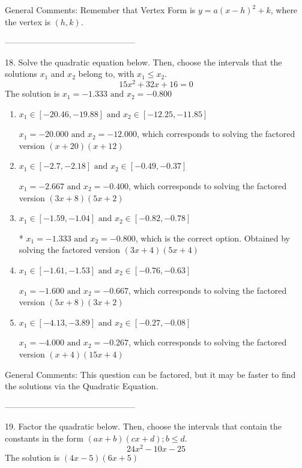 \documentclass{article}[14pt]
\begin{document}
General Comments: Remember that Vertex Form is $y = a(x-h)^2+k$, where the vertex is $(h, k)$.

-----------------------------------------------

18. Solve the quadratic equation below. Then, choose the intervals that the solutions $x_1$ and $x_2$ belong to, with $x_1 \leq x_2$.
$$ 15x^{2} +32 x + 16 = 0 $$ 
The solution is $ x_1 = -1.333 \text{ and } x_2 = -0.800 $ 

\begin{enumerate}[label=\Alph*.] 
\item $ x_1 \in [-20.46, -19.88] \text{ and } x_2 \in [-12.25, -11.85] $ 

 $x_1 = -20.000 \text{ and } x_2 = -12.000$, which corresponds to solving the factored version $(x + 20)(x + 12)$ 
\item $ x_1 \in [-2.7, -2.18] \text{ and } x_2 \in [-0.49, -0.37] $ 

 $x_1 = -2.667 \text{ and } x_2 = -0.400$, which corresponds to solving the factored version $(3x + 8)(5x + 2)$ 
\item $ x_1 \in [-1.59, -1.04] \text{ and } x_2 \in [-0.82, -0.78] $ 

 * $x_1 = -1.333 \text{ and } x_2 = -0.800$, which is the correct option. Obtained by solving the factored version $(3x + 4)(5x + 4)$ 
\item $ x_1 \in [-1.61, -1.53] \text{ and } x_2 \in [-0.76, -0.63] $ 

 $x_1 = -1.600 \text{ and } x_2 = -0.667$, which corresponds to solving the factored version $(5x + 8)(3x + 2)$ 
\item $ x_1 \in [-4.13, -3.89] \text{ and } x_2 \in [-0.27, -0.08] $ 

 $x_1 = -4.000 \text{ and } x_2 = -0.267$, which corresponds to solving the factored version $(x + 4)(15x + 4)$ 
\end{enumerate} 
 
General Comments: This question can be factored, but it may be faster to find the solutions via the Quadratic Equation.

-----------------------------------------------

19. Factor the quadratic below. Then, choose the intervals that contain the constants in the form $(ax+b)(cx+d); b \leq d.$
$$ 24x^{2} -10 x -25 $$ 
The solution is $ (4x -5)(6x + 5) $ 
\end{document}

